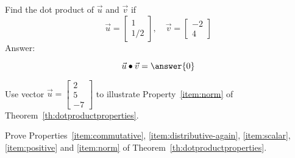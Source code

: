 \documentclass{ximera}
\begin{document}
\begin{problem}\label{prob:dotproduct2}
Find the dot product of $\vec{u}$ and $\vec{v}$ if
  $$\vec{u}=\begin{bmatrix}1\\1/2\end{bmatrix},\quad \vec{v}=\begin{bmatrix}-2\\4\end{bmatrix}$$
  Answer:
   
  $$\vec{u} \dotp \vec{v} = \answer{0}$$
\end{problem}
 
\begin{problem}\label{prob:dotproductprop6}
  Use vector $\vec{u}=\begin{bmatrix}2\\5\\-7\end{bmatrix}$ to
  illustrate Property~\ref{item:norm} of Theorem~\ref{th:dotproductproperties}.
\end{problem}
 
\begin{problem}\label{prob:th:dotprductproperties}
  Prove Properties~\ref{item:commutative}, \ref{item:distributive-again}, \ref{item:scalar}, \ref{item:positive} and \ref{item:norm} of Theorem~\ref{th:dotproductproperties}.
\end{problem}
 
\end{document}
